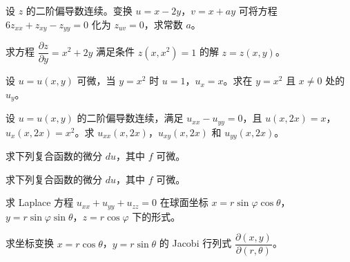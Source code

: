 \newpage
\noindent\begin{minipage}{\textwidth}
设 $z$ 的二阶偏导数连续。变换 $u=x-2y$，$v=x+ay$ 可将方程 $6z_{xx}+z_{xy}-z_{yy}=0$ 化为 $z_{uv}=0$，求常数 $a$。
\end{minipage}\par\vfill
\noindent\begin{minipage}{\textwidth}
求方程 $\dfrac{\partial z}{\partial y}=x^2+2y$ 满足条件 $z(x,x^2)=1$ 的解 $z=z(x,y)$。
\end{minipage}\par\vfill
\noindent\begin{minipage}{\textwidth}
设 $u=u(x,y)$ 可微，当 $y=x^2$ 时 $u=1$，$u_x=x$。求在 $y=x^2$ 且 $x\ne0$ 处的 $u_y$。
\end{minipage}\par\vfill
\noindent\begin{minipage}{\textwidth}
设 $u=u(x,y)$ 的二阶偏导数连续，满足 $u_{xx}-u_{yy}=0$，且 $u(x,2x)=x$，$u_x(x,2x)=x^2$。求 $u_{xx}(x,2x)$，$u_{xy}(x,2x)$ 和 $u_{yy}(x,2x)$。
\end{minipage}\par\vfill
\newpage
\noindent\begin{minipage}{\textwidth}
求下列复合函数的微分 $du$，其中 $f$ 可微。
\end{minipage}\par\vfill
\noindent\begin{minipage}{\textwidth}
求下列复合函数的微分 $du$，其中 $f$ 可微。
\end{minipage}\par\vfill
\noindent\begin{minipage}{\textwidth}
求 Laplace 方程 $u_{xx}+u_{yy}+u_{zz}=0$ 在球面坐标 $x=r\sin\varphi\cos\theta$，$y=r\sin\varphi\sin\theta$，$z=r\cos\varphi$ 下的形式。
\end{minipage}\par\vfill
\noindent\begin{minipage}{\textwidth}
求坐标变换 $x=r\cos\theta$，$y=r\sin\theta$ 的 Jacobi 行列式 $\dfrac{\partial(x,y)}{\partial(r,\theta)}$。
\end{minipage}\par\vfill
